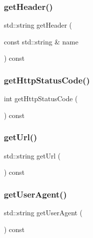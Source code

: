 \subsubsection{\texorpdfstring{get\+Header()}{getHeader()}}
{\footnotesize\ttfamily std\+::string get\+Header (\begin{DoxyParamCaption}\item[{const std\+::string \&}]{name }\end{DoxyParamCaption}) const}

\mbox{\label{classiurlstream_ab6c069ef77f1319830dcfd90eed6a2ce}} 
\subsubsection{\texorpdfstring{get\+Http\+Status\+Code()}{getHttpStatusCode()}}
{\footnotesize\ttfamily int get\+Http\+Status\+Code (\begin{DoxyParamCaption}{ }\end{DoxyParamCaption}) const}

\mbox{\label{classiurlstream_a0cbda75589e2fb500bbe875b72f66682}} 
\subsubsection{\texorpdfstring{get\+Url()}{getUrl()}}
{\footnotesize\ttfamily std\+::string get\+Url (\begin{DoxyParamCaption}{ }\end{DoxyParamCaption}) const}

\mbox{\label{classiurlstream_a479f109234aad1c792be804bf6320c62}} 
\subsubsection{\texorpdfstring{get\+User\+Agent()}{getUserAgent()}}
{\footnotesize\ttfamily std\+::string get\+User\+Agent (\begin{DoxyParamCaption}{ }\end{DoxyParamCaption}) const}

